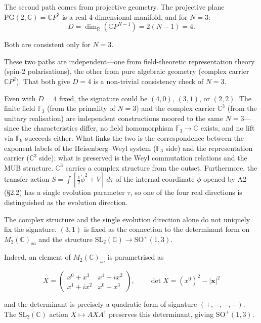 \documentclass[12pt,a4paper]{article}
\begin{document}
The second path comes from projective geometry. The projective plane $\mathrm{PG}(2, \mathbb{C}) = \mathbb{C}P^2$ is a real 4-dimensional manifold, and for $N = 3$:
\begin{equation}
  D = \dim_{\mathbb{R}}(\mathbb{C}P^{N-1}) = 2(N{-}1) = 4.
\end{equation}

\noindent
Both are consistent only for $N = 3$.

These two paths are independent---one from field-theoretic representation theory (spin-2 polarisations), the other from pure algebraic geometry (complex carrier $\mathbb{C}P^2$). That both give $D = 4$ is a non-trivial consistency check of $N = 3$.

Even with $D = 4$ fixed, the signature could be $(4,0)$, $(3,1)$, or $(2,2)$. The finite field $\mathbb{F}_3$ (from the primality of $N = 3$) and the complex carrier $\mathbb{C}^3$ (from the unitary realisation) are independent constructions moored to the same $N = 3$---since the characteristics differ, no field homomorphism $\mathbb{F}_3 \to \mathbb{C}$ exists, and no lift via $\mathbb{F}_9$ succeeds either. What links the two is the correspondence between the exponent labels of the Heisenberg--Weyl system ($\mathbb{F}_3$ side) and the representation carrier ($\mathbb{C}^3$ side); what is preserved is the Weyl commutation relations and the MUB structure. $\mathbb{C}^3$ carries a complex structure from the outset. Furthermore, the transfer action $S = \int[\tfrac{1}{2}\dot\phi^2 + V]\,d\tau$ of the internal coordinate $\phi$ opened by A2 (\S2.2) has a single evolution parameter $\tau$, so one of the four real directions is distinguished as the evolution direction.

The complex structure and the single evolution direction alone do not uniquely fix the signature. $(3,1)$ is fixed as the connection to the determinant form on $M_2(\mathbb{C})_{sa}$ and the structure $\mathrm{SL}_2(\mathbb{C}) \to \mathrm{SO}^+(1,3)$.

Indeed, an element of $M_2(\mathbb{C})_{sa}$ is parametrised as

\[X = \begin{pmatrix} x^0 + x^3 & x^1 - i x^2 \\ x^1 + i x^2 & x^0 - x^3 \end{pmatrix},\qquad \det X = (x^0)^2 - |\boldsymbol{x}|^2\]

and the determinant is precisely a quadratic form of signature $(+,-,-,-)$. The $\mathrm{SL}_2(\mathbb{C})$ action $X \mapsto AXA^\dagger$ preserves this determinant, giving $\mathrm{SO}^+(1,3)$.
\end{document}
